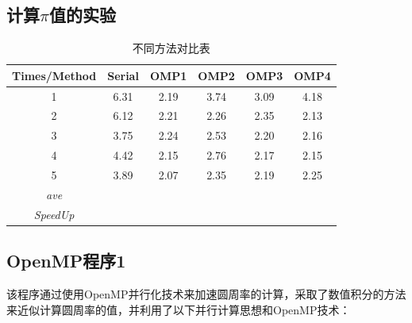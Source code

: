 \documentclass{article}
\begin{document}
\subsection{计算$\pi$值的实验}
\begin{table}[H]
    \centering
    \caption{不同方法对比表}
    \label{my-label}
    \begin{tabular}{@{}cccccc@{}}
    \toprule
    Times/Method & Serial & OMP1 & OMP2 & OMP3 & OMP4 \\ \midrule
    1            &   6.31     &    2.19  &   3.74   &   3.09   &   4.18   \\
    2            &     6.12   &   2.21   &   2.26   &    2.35  &    2.13  \\
    3            &      3.75  &   2.24   &   2.53   &   2.20   &   2.16   \\
    4            &     4.42   &    2.15  &   2.76   &   2.17   &    2.15  \\
    5            &     3.89   &  2.07    &   2.35   &   2.19   &    2.25  \\
    \textit{ave} &        &      &      &      &      \\
    \textit{SpeedUp} &        &      &      &      &      \\ \bottomrule
    \end{tabular}
\end{table}
\subsection{OpenMP程序1}
该程序通过使用OpenMP并行化技术来加速圆周率的计算，采取了数值积分的方法来近似计算圆周率的值，并利用了以下并行计算思想和OpenMP技术：
\end{document}
